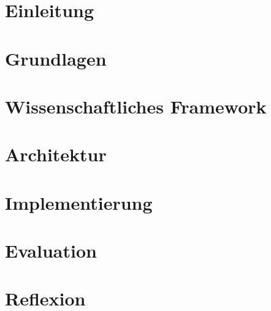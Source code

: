 	\chapter{Einleitung}
		\label{chap:einleitung}
		
	
	\chapter{Grundlagen}
		\label{chap:grundlagen}
		
	\chapter{Wissenschaftliches Framework}
		\label{chap:wissenschaftliches_framework}
		
		
	\chapter{Architektur}
		\label{chap:architektur}
		
		
	\chapter{Implementierung}
		\label{chap:implementierung}
		
		
	\chapter{Evaluation}
		\label{chap:evaluation}
		
		
	\chapter{Reflexion}
		\label{chap:reflexion}
		


	\clearpage
	\pagestyle{plain}
	\printbibliography

